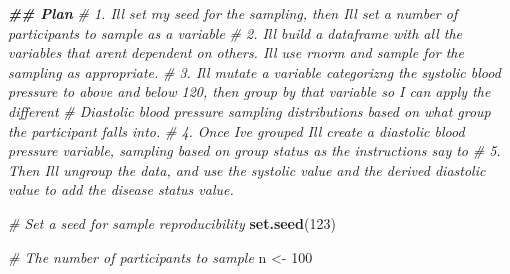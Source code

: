 \documentclass[
]{article}
\newenvironment{Shaded}{\begin{snugshade}}{\end{snugshade}}
\newcommand{\CommentTok}[1]{\textcolor[rgb]{0.56,0.35,0.01}{\textit{#1}}}
\newcommand{\DecValTok}[1]{\textcolor[rgb]{0.00,0.00,0.81}{#1}}
\newcommand{\DocumentationTok}[1]{\textcolor[rgb]{0.56,0.35,0.01}{\textbf{\textit{#1}}}}
\newcommand{\FunctionTok}[1]{\textcolor[rgb]{0.13,0.29,0.53}{\textbf{#1}}}
\newcommand{\NormalTok}[1]{#1}
\newcommand{\OtherTok}[1]{\textcolor[rgb]{0.56,0.35,0.01}{#1}}
\begin{document}
\begin{Shaded}
\begin{Highlighting}[]
\DocumentationTok{\#\# Plan}
\CommentTok{\# 1. I\textquotesingle{}ll set my seed for the sampling, then I\textquotesingle{}ll set a number of participants to sample as a variable}
\CommentTok{\# 2. I\textquotesingle{}ll build a dataframe with all the variables that aren\textquotesingle{}t dependent on others. I\textquotesingle{}ll use rnorm and sample for the sampling as appropriate.}
\CommentTok{\# 3. I\textquotesingle{}ll mutate a variable categorizng the systolic blood pressure to above and below 120, then group by that variable so I can apply the different }
\CommentTok{\#    Diastolic blood pressure sampling distributions based on what group the participant falls into. }
\CommentTok{\# 4. Once I\textquotesingle{}ve grouped I\textquotesingle{}ll create a diastolic blood pressure variable, sampling based on group status as the instructions say to}
\CommentTok{\# 5. Then I\textquotesingle{}ll ungroup the data, and use the systolic value and the derived diastolic value to add the disease status value. }

\CommentTok{\# Set a seed for sample reproducibility}
\FunctionTok{set.seed}\NormalTok{(}\DecValTok{123}\NormalTok{)}

\CommentTok{\# The number of participants to sample}
\NormalTok{n }\OtherTok{\textless{}{-}} \DecValTok{100}  


\end{Highlighting}
\end{Shaded}
\end{document}
